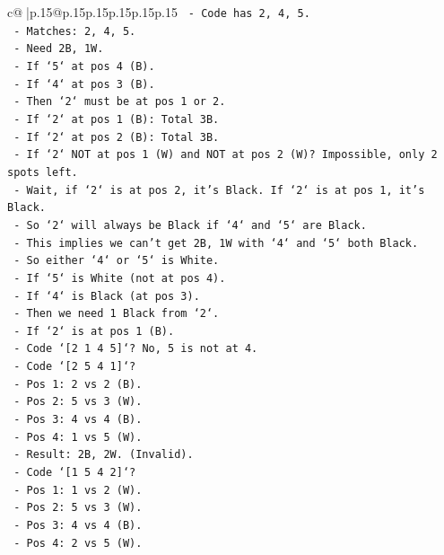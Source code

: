 \documentclass{article}
\begin{document}
{\begin{supertabular}{c@{$\;$}|p{.15\linewidth}@{}p{.15\linewidth}p{.15\linewidth}p{.15\linewidth}p{.15\linewidth}p{.15\linewidth}}
{{{\texttt{    {-} Code has 2, 4, 5.} \\
\texttt{    {-} Matches: 2, 4, 5.} \\
\texttt{    {-} Need 2B, 1W.} \\
\texttt{    {-} If `5` at pos 4 (B).} \\
\texttt{    {-} If `4` at pos 3 (B).} \\
\texttt{    {-} Then `2` must be at pos 1 or 2.} \\
\texttt{    {-} If `2` at pos 1 (B): Total 3B.} \\
\texttt{    {-} If `2` at pos 2 (B): Total 3B.} \\
\texttt{    {-} If `2` NOT at pos 1 (W) and NOT at pos 2 (W)? Impossible, only 2 spots left.} \\
\texttt{    {-} Wait, if `2` is at pos 2, it's Black. If `2` is at pos 1, it's Black.} \\
\texttt{    {-} So `2` will always be Black if `4` and `5` are Black.} \\
\texttt{    {-} This implies we can't get 2B, 1W with `4` and `5` both Black.} \\
\texttt{    {-} So either `4` or `5` is White.} \\
\texttt{    {-} If `5` is White (not at pos 4).} \\
\texttt{    {-} If `4` is Black (at pos 3).} \\
\texttt{    {-} Then we need 1 Black from `2`.} \\
\texttt{    {-} If `2` is at pos 1 (B).} \\
\texttt{    {-} Code `{[}2 1 4 5{]}`? No, 5 is not at 4.} \\
\texttt{    {-} Code `{[}2 5 4 1{]}`?} \\
\texttt{        {-} Pos 1: 2 vs 2 (B).} \\
\texttt{        {-} Pos 2: 5 vs 3 (W).} \\
\texttt{        {-} Pos 3: 4 vs 4 (B).} \\
\texttt{        {-} Pos 4: 1 vs 5 (W).} \\
\texttt{        {-} Result: 2B, 2W. (Invalid).} \\
\texttt{    {-} Code `{[}1 5 4 2{]}`?} \\
\texttt{        {-} Pos 1: 1 vs 2 (W).} \\
\texttt{        {-} Pos 2: 5 vs 3 (W).} \\
\texttt{        {-} Pos 3: 4 vs 4 (B).} \\
\texttt{        {-} Pos 4: 2 vs 5 (W).} \\
}}}
\end{supertabular}}
\end{document}

